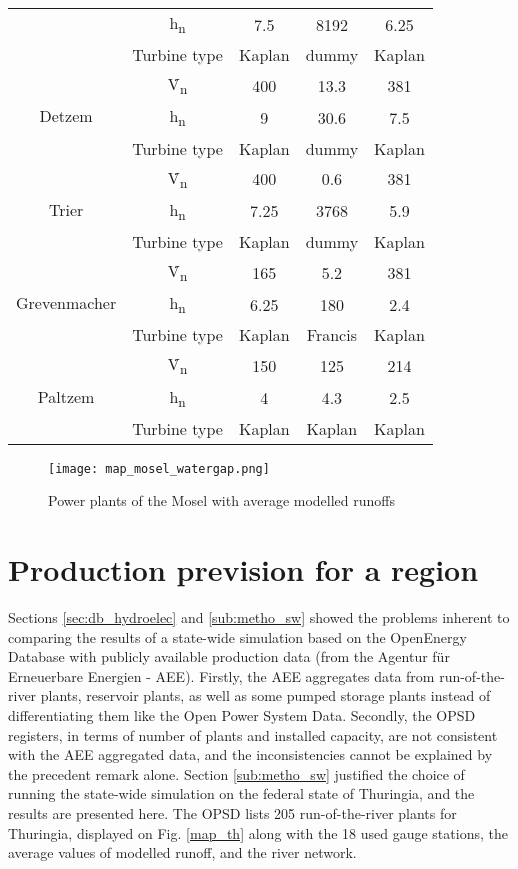 \begin{longtable}{|c|c|c|c|c|}
  &h\textsubscript{n}&7.5&8192&6.25\\
  &Turbine type&Kaplan&dummy&Kaplan\\
  \hline
  \multirow{3}{*}{Detzem}&\.V\textsubscript{n}&400&13.3&381\\
  &h\textsubscript{n}&9&30.6&7.5\\
  &Turbine type&Kaplan&dummy&Kaplan\\
  \hline
  \multirow{3}{*}{Trier}&\.V\textsubscript{n}&400&0.6&381\\
  &h\textsubscript{n}&7.25&3768&5.9\\
  &Turbine type&Kaplan&dummy&Kaplan\\
  \hline
  \multirow{3}{*}{Grevenmacher}&\.V\textsubscript{n}&165&5.2&381\\
  &h\textsubscript{n}&6.25&180&2.4\\
  &Turbine type&Kaplan&Francis&Kaplan\\
  \hline
  \multirow{3}{*}{Paltzem}&\.V\textsubscript{n}&150&125&214\\
  &h\textsubscript{n}&4&4.3&2.5\\
  &Turbine type&Kaplan&Kaplan&Kaplan\\
\end{longtable}
\endgroup

\begin{figure}[H]
\centering
\texttt{[image: map\_mosel\_watergap.png]}
\caption{Power plants of the Mosel with average modelled runoffs}
\label{map_mosel_watergap}
\end{figure}

\section{Production prevision for a region}
\label{sec:res_th}

Sections \ref{sec:db_hydroelec} and \ref{sub:metho_sw} showed the problems inherent to comparing the results of a state-wide simulation based on the OpenEnergy Database with publicly available production data (from the Agentur für Erneuerbare Energien - AEE). Firstly, the AEE aggregates data from run-of-the-river plants, reservoir plants, as well as some pumped storage plants instead of differentiating them like the Open Power System Data. Secondly, the OPSD registers, in terms of number of plants and installed capacity, are not consistent with the AEE aggregated data, and the inconsistencies cannot be explained by the precedent remark alone. \newline
Section \ref{sub:metho_sw} justified the choice of running the state-wide simulation on the federal state of Thuringia, and the results are presented here. \newline
The OPSD lists 205 run-of-the-river plants for Thuringia, displayed on Fig. \ref{map_th} along with the 18 used gauge stations, the average values of modelled runoff, and the river network.

